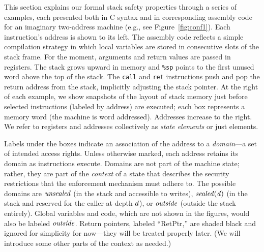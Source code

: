 \documentclass[10pt,conference]{ieeetran}%
\theoremstyle{definition}
\begin{document}
This section explains our formal stack safety properties through a series
of examples, each presented both in C syntax and in corresponding assembly code for an
imaginary two-address machine (e.g., see Figure~\ref{fig:conf1}).
Each instruction's address is shown to its left.
The assembly code reflects a simple compilation strategy in which
local variables are stored in consecutive slots of the stack frame.
For the moment, arguments and return values are passed in registers.
The stack grows upward in
memory and {\tt \%sp} points to the first unused word above the top of the stack.
The {\tt call} and {\tt ret} instructions push and pop the return address from the stack,
implicitly adjusting the stack pointer.
At the right of each example, we show snapshots of the layout of stack memory just before
selected instructions (labeled by address) are executed; each box represents a memory word
(the machine is word addressed). Addresses increase to the right.
We refer to registers and addresses collectively as {\em state elements} or just elements.

Labels under the boxes indicate an association of the address to a
{\em domain}---a set of intended access
rights. Unless otherwise marked, each address retains its domain as
instructions execute. %
Domains are not part of the machine state; rather, they are part
of the {\em context} of a state that describes the security restrictions
that the enforcement mechanism must adhere to.
The possible domains
are \(\mathit{unsealed}\) (in the stack and accessible to writes), \(\mathit{sealed(d)}\)
(in the stack and reserved for the caller at depth \(d\)), or \(\mathit{outside}\)
(outside the stack entirely).
Global variables and code, which are not shown in the figures, would
also be labeled \(\mathit{outside}\). Return pointers, labeled ``RetPtr,''
are shaded black and ignored for simplicity for now---they will
be treated properly later.
(We will introduce some other parts of the context as needed.)
\end{document}
